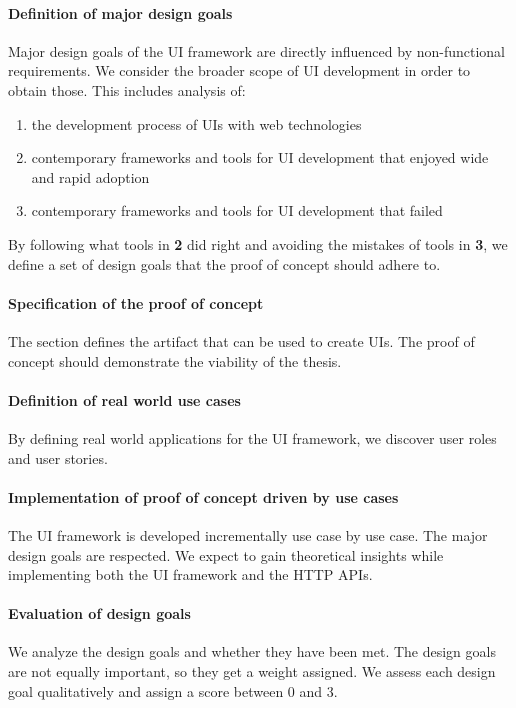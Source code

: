 \paragraph{Definition of major design goals}
Major design goals of the UI framework are directly influenced by non-functional requirements. We consider the broader scope of UI development in order to obtain those. This includes analysis of:

\begin{enumerate}
  \item the development process of UIs with web technologies
  \item contemporary frameworks and tools for UI development that enjoyed wide and rapid adoption
  \item contemporary frameworks and tools for UI development that failed
\end{enumerate}

By following what tools in \textbf{2} did right and avoiding the mistakes of tools in \textbf{3}, we define a set of design goals that the proof of concept should adhere to.

\paragraph{Specification of the proof of concept}
The section defines the artifact that can be used to create UIs. The proof of concept should demonstrate the viability of the thesis.

\paragraph{Definition of real world use cases}
By defining real world applications for the UI framework, we discover user roles and user stories.

\paragraph{Implementation of proof of concept driven by use cases}
The UI framework is developed incrementally use case by use case. The major design goals are respected. We expect to gain theoretical insights while implementing both the UI framework and the HTTP APIs.

\paragraph{Evaluation of design goals}
We analyze the design goals and whether they have been met. The design goals are not equally important, so they get a weight assigned. We assess each design goal qualitatively and assign a score between 0 and 3.

